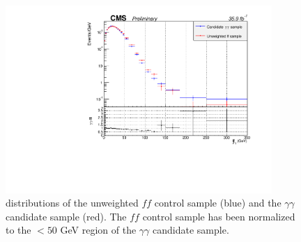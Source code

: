 \begin{figure}[h]
\begin{center}
\includegraphics[width=0.9\textwidth]{Figures/DataAnalysis/ggffUnweighted.pdf}
\end{center}
\caption{\ETmiss distributions of the unweighted $ff$ control sample (blue) and the $\gamma\gamma$ candidate sample (red). The $ff$ control sample has been normalized to the \ETmiss $ < 50$ GeV region of the $\gamma\gamma$ candidate sample. }
\label{fig:ggffUnweighted}
\end{figure}


